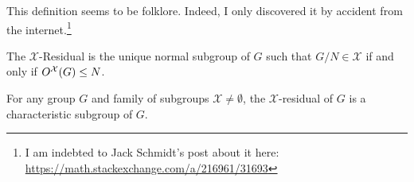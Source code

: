 \begin{def-remark}
This definition seems to be folklore. Indeed, I only discovered it by
accident from the internet.\footnote{I am indebted to Jack Schmidt's
post about it here: \url{https://math.stackexchange.com/a/216961/31693}}
\end{def-remark}

\begin{theorem}
The $\mathcal{X}$-Residual is the unique normal subgroup of $G$ such
that $G/N\in\mathcal{X}$ if and only if $O^{\mathcal{X}}(G)\leq N$.
\end{theorem}

\begin{theorem}
For any group $G$ and family of subgroups $\mathcal{X}\neq\emptyset$,
the $\mathcal{X}$-residual of $G$ is a characteristic subgroup of $G$.
\end{theorem}
